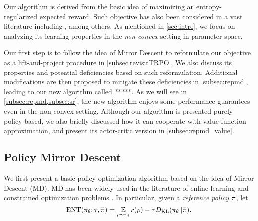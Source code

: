 Our algorithm is derived from the basic idea of maximizing an entropy-regularized expected reward. Such objective has also been considered in a vast literature including \citet{williams1991function,fox2015taming,schulman2017equivalence,nachum2017bridging,haarnoja2017reinforcement}, among others.
As mentioned in \cref{sec:intro}, we focus on analyzing its learning properties in the \emph{non-convex} setting in parameter space.

Our first step is to follow the idea of Mirror Descent to reformulate our 
objective as a lift-and-project procedure in \cref{subsec:revisitTRPO}. 
We also discuss its properties and potential deficiencies based on such reformulation.
Additional modifications are then proposed  to mitigate these deficiencies in \cref{subsec:repmd}, leading to our new algorithm called *****.
As we will see in \cref{subsec:repmd,subsec:sr}, the new algorithm enjoys some  performance guarantees even in the non-convex setting. 
Although our algorithm is presented purely policy-based, we also briefly discussed how it can cooperate with value function approximation, and present its actor-critic version in \cref{subsec:repmd_value}.

\subsection{Policy Mirror Descent}
\label{sec:pmd}
We first present a basic policy optimization algorithm based on the idea of Mirror Descent (MD). MD has been widely used in the literature of online learning and constrained optimization problems \citep{nemirovskii1983problem,beck2003mirror}. In particular, given a \emph{reference policy} $\bar{\pi}$, let 
\begin{equation*}
\text{ENT}(\pi_\theta; \tau, \bar{\pi}) = { \operatorname*{\mathbb{E}}\limits_{\rho \sim \pi_\theta}{  r(\rho)  - \tau D_{\mathrm{KL}}(\pi_\theta \| \bar{\pi}) } }.
\end{equation*}


